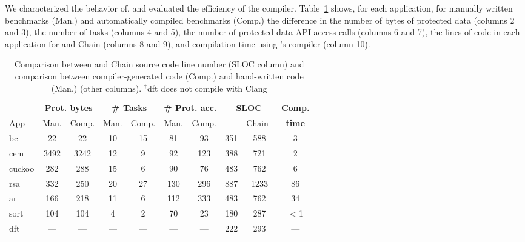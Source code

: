 We characterized the behavior of, and evaluated the efficiency of the \sys
compiler.  Table~\ref{table:compiler_result} shows, for each application, for
manually written benchmarks (Man.) and automatically compiled benchmarks
(Comp.) the difference in the number of bytes of protected data (columns 2 and
3), the number of tasks (columns 4 and 5), the number of \sys protected data
API access calls (columns 6 and 7), the lines of code in each application for
\sys and Chain (columns 8 and 9), and compilation time using \sys's compiler
(column 10). 

\begin{table}[t]
	\centering
	\footnotesize
        \renewcommand{\tabcolsep}{1pt}
	\begin{tabular}{|l|cc|cc|cc|cc|c|}
		\hline
		{} & \multicolumn{2}{c|}{{\bf Prot. bytes}} & \multicolumn{2}{c|}{{\bf \# Tasks}} & \multicolumn{2}{c|}{{\bf \# Prot. acc.}} & \multicolumn{2}{c|}{\bf SLOC} & {\bf Comp.} \\
		App & Man. & Comp. & Man. & Comp. & Man. & Comp. & \multicolumn{1}{l}{\sys} & \multicolumn{1}{r|}{Chain~\cite{chain}} & {\bf time} \\
		\hline\hline
		bc & 22 & 22 & 10 & 15 & 81 & 93 & 351 &588 & 3\\
		cem & 3492 & 3242 & 12 & 9 & 92 & 123 & 388 &721 & 2\\
		cuckoo & 282 & 288 & 15 & 6 & 90 & 76 & 483 &762 & 6\\
		rsa & 332 & 250 & 20 & 27 & 130 & 296 & 887 &1233 & 86\\
		ar & 166 & 218 & 11 & 6 & 112 & 333 & 483 &762 & 34\\
		sort & 104 & 104 & 4 & 2 & 70 & 23 & 180 & 287 & $<$1\\
		dft$^\dagger$ & --- & --- & --- & --- & --- & --- & 222 & 293 & ---\\
		\hline
	\end{tabular}
	\caption{Comparison between \sys and Chain source code line number (SLOC column) and comparison between compiler-generated \sys code (Comp.) and hand-written \sys code (Man.) (other columns). $^\dagger$dft does not compile with Clang}
\label{table:compiler_result}
\end{table}

